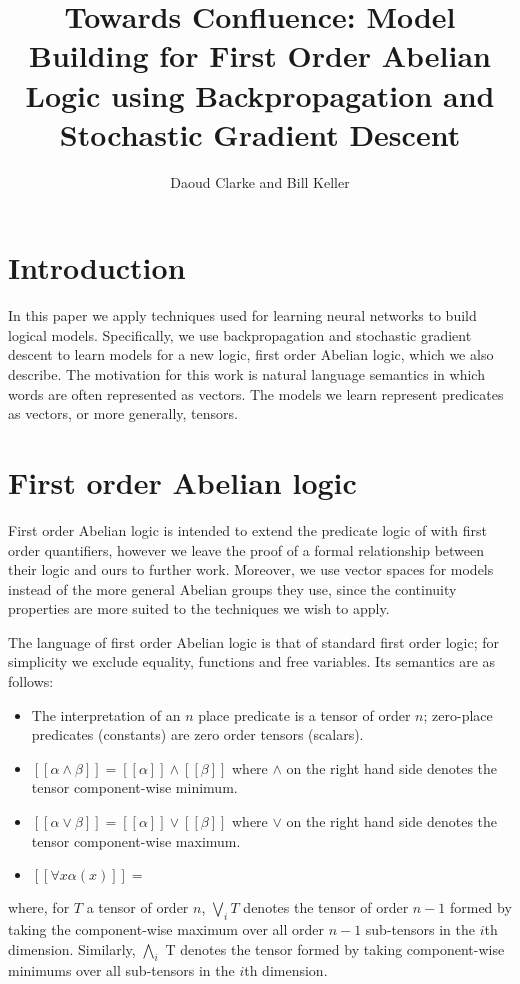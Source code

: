\documentclass{article}
\title{Towards Confluence: Model Building for First Order Abelian
  Logic using Backpropagation and Stochastic Gradient Descent}
\author{Daoud Clarke and Bill Keller}
\newcommand{\interp}[1]{[\![ #1 ]\!]}
\begin{document}
\maketitle

\section{Introduction}

In this paper we apply techniques used for learning neural networks to
build logical models. Specifically, we use backpropagation and
stochastic gradient descent to learn models for a new logic, first
order Abelian logic, which we also describe. The motivation for this
work is natural language semantics in which words are often
represented as vectors. The models we learn represent predicates as
vectors, or more generally, tensors.

\section{First order Abelian logic}

First order Abelian logic is intended to extend the predicate logic of
\cite{Meyer:89} with first order quantifiers, however we leave the
proof of a formal relationship between their logic and ours to further
work. Moreover, we use vector spaces for models instead of the more
general Abelian groups they use, since the continuity properties are
more suited to the techniques we wish to apply.

The language of first order Abelian logic is that of standard first
order logic; for simplicity we exclude equality, functions and free
variables. Its semantics are as follows:
\begin{itemize}
\item The interpretation of an $n$ place predicate is a tensor of
  order $n$; zero-place predicates (constants) are zero order tensors
  (scalars).
\item $\interp{\alpha \land \beta} = \interp{\alpha} \land
  \interp{\beta}$ where $\land$ on the right hand side denotes
  the tensor component-wise minimum.
\item $\interp{\alpha \lor \beta} = \interp{\alpha} \lor
  \interp{\beta}$ where $\lor$ on the right hand side denotes
  the tensor component-wise maximum.
\item $\interp{\forall x\alpha(x)} = $
\end{itemize}
where, for $T$ a tensor of order $n$, $\bigvee_i T$ denotes the tensor
of order $n-1$ formed by taking the component-wise maximum over all
order $n-1$ sub-tensors in the $i$th dimension. Similarly,
$\bigwedge_i$ T denotes the tensor formed by taking component-wise
minimums over all sub-tensors in the $i$th dimension.



\end{document}
